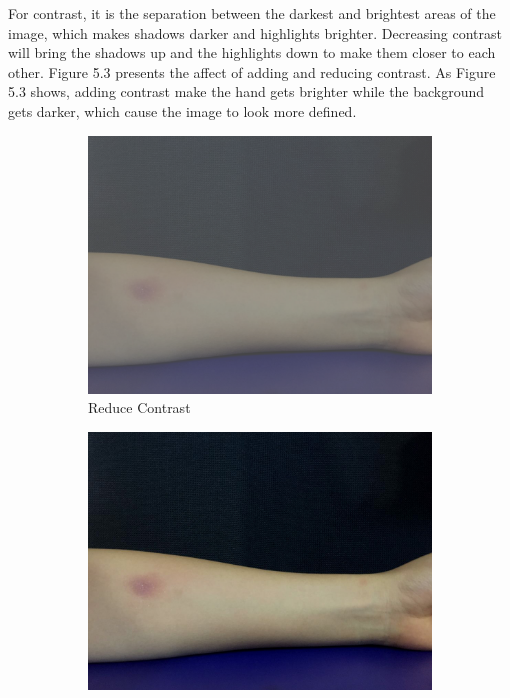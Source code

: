 For contrast, it is the separation between the darkest and brightest areas of the image, which makes shadows darker and highlights brighter. Decreasing contrast will bring the shadows up and the highlights down to make them closer to each other. Figure 5.3 presents the affect of adding and reducing contrast. As Figure 5.3 shows, adding contrast make the hand gets brighter while the background gets darker, which cause the image to look more defined. 
\begin{figure}[!h]
\centering
\begin{subfigure}{.35\textwidth}
  \centering
  \includegraphics[scale=0.14]{img/contrast1}
  \caption{Reduce Contrast}
  \label{fig:sub1}
\end{subfigure}%
\begin{subfigure}{.3\textwidth}
  \centering
  \includegraphics[scale=0.14]{img/original}

\end{subfigure}
\end{figure}
